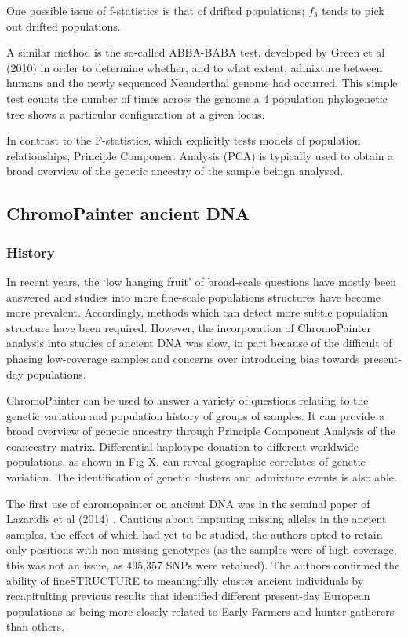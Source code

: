 One possible issue of f-statistics is that of drifted populations; $f_{3}$ tends to pick out drifted populations.

A similar method is the so-called ABBA-BABA test, developed by Green et al (2010) \cite{Green2010} in order to determine whether, and to what extent, admixture between humans and the newly sequenced Neanderthal genome had occurred. This simple test counts the number of times across the genome a 4 population phylogenetic tree shows a particular configuration at a given locus. 

In contrast to the F-statistics, which explicitly tests models of population relationships, Principle Component Analysis (PCA) is typically used to obtain a broad overview of the genetic ancestry of the sample beingn analysed.  

\subsection{ChromoPainter ancient DNA}

\subsubsection{History}

In recent years, the `low hanging fruit' of broad-scale questions have mostly been answered and studies into more fine-scale populations structures have become more prevalent. Accordingly, methods which can detect more subtle population structure have been required. However, the incorporation of ChromoPainter analysis into studies of ancient DNA was slow, in part because of the difficult of phasing low-coverage samples and concerns over introducing bias towards present-day populations. 

ChromoPainter can be used to answer a variety of questions relating to the genetic variation and population history of groups of samples. It can provide a broad overview of genetic ancestry through Principle Component Analysis of the coancestry matrix. Differential haplotype donation to different worldwide populations, as shown in Fig X, can reveal geographic correlates of genetic variation. The identification of genetic clusters and admixture events is also able. 

The first use of chromopainter on ancient DNA was in the seminal paper of Lazaridis et al (2014) \cite{Lazaridis2014}. Cautious about imptuting missing alleles in the ancient samples, the effect of which had yet to be studied, the authors opted to retain only positions with non-missing genotypes (as the samples were of high coverage, this was not an issue, as 495,357 SNPs were retained). The authors confirmed the ability of fineSTRUCTURE to meaningfully cluster ancient individuals by recapitulting previous results that identified different present-day European populations as being more closely related to Early Farmers and hunter-gatherers than others. 

